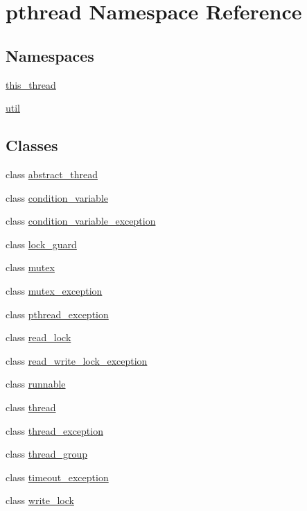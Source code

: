 \hypertarget{namespacepthread}{\section{pthread Namespace Reference}
\label{namespacepthread}
}
\subsection*{Namespaces}
\begin{DoxyCompactItemize}
\item 
 \hyperlink{namespacepthread_1_1this__thread}{this\+\_\+thread}
\item 
 \hyperlink{namespacepthread_1_1util}{util}
\end{DoxyCompactItemize}
\subsection*{Classes}
\begin{DoxyCompactItemize}
\item 
class \hyperlink{classpthread_1_1abstract__thread}{abstract\+\_\+thread}
\item 
class \hyperlink{classpthread_1_1condition__variable}{condition\+\_\+variable}
\item 
class \hyperlink{classpthread_1_1condition__variable__exception}{condition\+\_\+variable\+\_\+exception}
\item 
class \hyperlink{classpthread_1_1lock__guard}{lock\+\_\+guard}
\item 
class \hyperlink{classpthread_1_1mutex}{mutex}
\item 
class \hyperlink{classpthread_1_1mutex__exception}{mutex\+\_\+exception}
\item 
class \hyperlink{classpthread_1_1pthread__exception}{pthread\+\_\+exception}
\item 
class \hyperlink{classpthread_1_1read__lock}{read\+\_\+lock}
\item 
class \hyperlink{classpthread_1_1read__write__lock__exception}{read\+\_\+write\+\_\+lock\+\_\+exception}
\item 
class \hyperlink{classpthread_1_1runnable}{runnable}
\item 
class \hyperlink{classpthread_1_1thread}{thread}
\item 
class \hyperlink{classpthread_1_1thread__exception}{thread\+\_\+exception}
\item 
class \hyperlink{classpthread_1_1thread__group}{thread\+\_\+group}
\item 
class \hyperlink{classpthread_1_1timeout__exception}{timeout\+\_\+exception}
\item 
class \hyperlink{classpthread_1_1write__lock}{write\+\_\+lock}
\end{DoxyCompactItemize}
